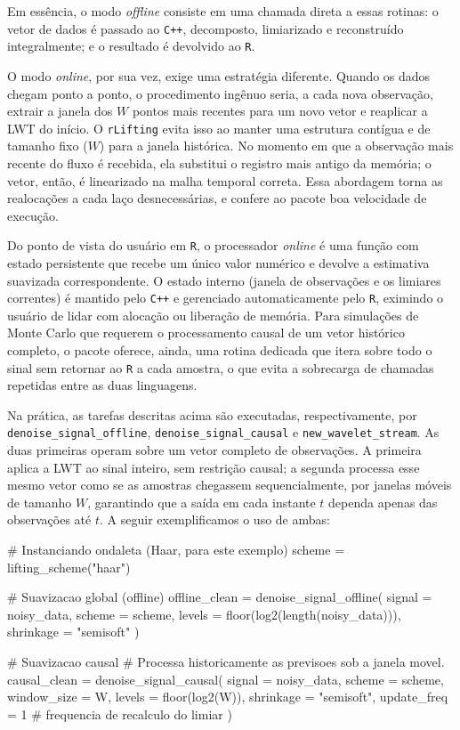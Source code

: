 Em essência, o modo \emph{offline} consiste em uma chamada direta a essas rotinas: o vetor de dados é passado ao \texttt{C++}, decomposto, limiarizado e reconstruído integralmente; e o resultado é devolvido ao \texttt{R}.

O modo \emph{online}, por sua vez, exige uma estratégia diferente. 
Quando os dados chegam ponto a ponto, o procedimento ingênuo seria, a cada nova observação, extrair a janela dos \(W\) pontos mais recentes para um novo vetor e reaplicar a LWT do início. 
O \texttt{rLifting} evita isso ao manter uma estrutura contígua e de tamanho fixo (\(W\)) para a janela histórica. 
No momento em que a observação mais recente do fluxo é recebida, ela substitui o registro mais antigo da memória; o vetor, então, é linearizado na malha temporal correta. 
Essa abordagem torna as realocações a cada laço desnecessárias, e confere ao pacote boa velocidade de execução.

Do ponto de vista do usuário em \texttt{R}, o processador \emph{online} é uma função com estado persistente que recebe um único valor numérico e devolve a estimativa suavizada correspondente. 
O estado interno (janela de observações e os limiares correntes) é mantido pelo \texttt{C++} e gerenciado automaticamente pelo \texttt{R}, eximindo o usuário de lidar com alocação ou liberação de memória. 
Para simulações de Monte Carlo que requerem o processamento causal de um vetor histórico completo, o pacote oferece, ainda, uma rotina dedicada que itera sobre todo o sinal sem retornar ao \texttt{R} a cada amostra, o que evita a sobrecarga de chamadas repetidas entre as duas linguagens.

Na prática, as tarefas descritas acima são executadas, respectivamente, por \texttt{denoise\_signal\_offline}, \texttt{denoise\_signal\_causal} e \texttt{new\_wavelet\_stream}. 
As duas primeiras operam sobre um vetor completo de observações. 
A primeira aplica a LWT ao sinal inteiro, sem restrição causal; a segunda processa esse mesmo vetor como se as amostras chegassem sequencialmente, por janelas móveis de tamanho \(W\), garantindo que a saída em cada instante \(t\) dependa apenas das observações até \(t\). 
A seguir exemplificamos o uso de ambas:

\begin{codeblock}
# Instanciando ondaleta (Haar, para este exemplo)
scheme = lifting_scheme("haar")

# Suavizacao global (offline)
offline_clean = denoise_signal_offline(
  signal = noisy_data,
  scheme = scheme,
  levels = floor(log2(length(noisy_data))),
  shrinkage = "semisoft"
)

# Suavizacao causal
# Processa historicamente as previsoes sob a janela movel.
causal_clean = denoise_signal_causal(
  signal = noisy_data,
  scheme = scheme,
  window_size = W,
  levels = floor(log2(W)),
  shrinkage = "semisoft",
  update_freq = 1  # frequencia de recalculo do limiar
)
\end{codeblock}

